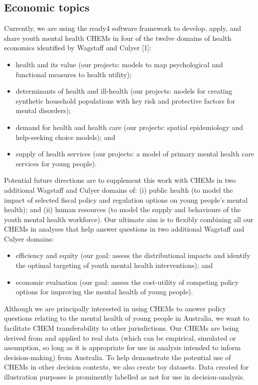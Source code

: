 \documentclass[
]{article}
\begin{document}
\hypertarget{economic-topics}{%
\subsection{Economic topics}\label{economic-topics}}

Currently, we are using the ready4 software framework to develop, apply, and share youth mental health CHEMs in four of the twelve domains of health economics identified by Wagstaff and Culyer {[}1{]}:

\begin{itemize}
\item
  health and its value (our projects: models to map psychological and functional measures to health utility);
\item
  determinants of health and ill-health (our projects: models for creating synthetic household populations with key risk and protective factors for mental disorders);
\item
  demand for health and health care (our projects: spatial epidemiology and help-seeking choice models); and
\item
  supply of health services (our projects: a model of primary mental health care services for young people).
\end{itemize}

Potential future directions are to supplement this work with CHEMs in two additional Wagstaff and Culyer domains of: (i) public health (to model the impact of selected fiscal policy and regulation options on young people's mental health); and (ii) human resources (to model the supply and behaviours of the youth mental health workforce). Our ultimate aim is to flexibly combining all our CHEMs in analyses that help answer questions in two additional Wagstaff and Culyer domains:

\begin{itemize}
\item
  efficiency and equity (our goal: assess the distributional impacts and identify the optimal targeting of youth mental health interventions); and
\item
  economic evaluation (our goal: assess the cost-utility of competing policy options for improving the mental health of young people).
\end{itemize}

Although we are principally interested in using CHEMs to answer policy questions relating to the mental health of young people in Australia, we want to facilitate CHEM transferability to other jurisdictions. Our CHEMs are being derived from and applied to real data (which can be empirical, simulated or assumption, so long as it is appropriate for use in analysis intended to inform decision-making) from Australia. To help demonstrate the potential use of CHEMs in other decision contexts, we also create toy datasets. Data created for illustration purposes is prominently labelled as not for use in decision-analysis.
\end{document}
